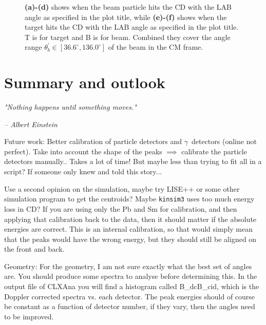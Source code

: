 \documentclass[twoside,english]{uiofysmaster/uiofysmaster}
\newcommand{\ga}{$\gamma$}
\let\orgautoref\autoref
\renewcommand{\autoref}
        {%
		 \def\sectionautorefname{Section}%
		 \def\subsectionautorefname{Section}%
		 \def\subsubsectionautorefname{Section}%
		 \def\chapterautorefname{Chapter}%
          \orgautoref}
\begin{document}
\begin{figure}[htb!]
\begin{subfigure}[t]{0.49\textwidth}
		\caption{}
	\end{subfigure}
	\caption{\textbf{(a)-(d)} shows when the beam particle hits the CD with the LAB angle as specified in the plot title, while \textbf{(e)-(f)} shows when the target hits the CD with the LAB angle as specified in the plot title. T is for target and B is for beam. Combined they cover the angle range $\theta_b^{'} \in [36.6^\circ, 136.0^\circ]$ of the beam in the CM frame.}
	\label{fig:projections}
\end{figure}



\bigskip







\chapter{Summary and outlook}
\epigraph{\textit{"Nothing happens until something moves."}}{\textit{– Albert Einstein}}


Future work: Better calibration of particle detectors and \ga\ detectors (online not perfect). Take into account the shape of the peaks $\implies$ calibrate the particle detectors manually.. Takes a lot of time! But maybe less than trying to fit all in a script? If someone only knew and told this story...

Use a second opinion on the simulation, maybe try LISE++ or some other simulation program to get the centroids?
Maybe \texttt{kinsim3} uses too much energy loss in CD? 
If you are using only the Pb and Sm for calibration, and then applying that calibration back to the data, then it should matter if the absolute energies are correct. 
This is an internal calibration, so that would simply mean that the peaks would have the wrong energy, but they should still be aligned on the front and back.


\bigskip

Geometry:
For the geometry, I am not sure exactly what the best set of angles are. You should produce some spectra to analyse before determining this. In the output file of CLXAna you will find a histogram called B\_dcB\_cid, which is the Doppler corrected spectra vs. each detector. The peak energies should of course be constant as a function of detector number, if they vary, then the angles need to be improved.
\end{document}
